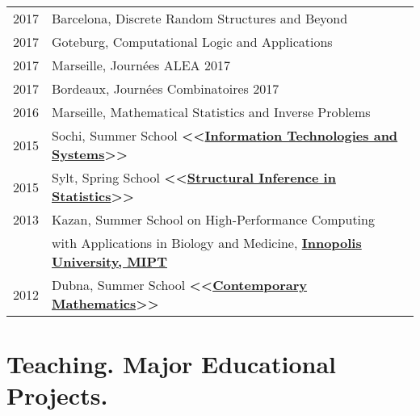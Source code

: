 \documentclass[a4paper,10pt]{article} %
\begin{document}
\begin{tabular}{rl}
2017 & Barcelona, Discrete Random Structures and Beyond\\
2017 & Goteburg, Computational Logic and Applications\\
2017 & Marseille, Journées ALEA 2017\\
2017 & Bordeaux, Journées Combinatoires 2017\\
2016 & Marseille, Mathematical Statistics and Inverse Problems\\
2015 & Sochi, Summer School \textbf{<<\href{http://itas2015.iitp.ru/en/}{Information Technologies and Systems}>>}\\
2015 & Sylt, Spring School \textbf{<<\href{https://www.mathematik.hu-berlin.de/de/for1735/prior-events/spring-school-2015}{Structural Inference in Statistics}>>} \\
2013 & Kazan, Summer School on High-Performance Computing\\& with Applications in Biology and Medicine, \textbf{\href{http://habrahabr.ru/company/innopolis_university/blog/192948/}{Innopolis University, MIPT}} \\
2012 & Dubna, Summer School \textbf{<<\href{http://www.mccme.ru/dubna/eng/}{Contemporary Mathematics}>>} \\
\end{tabular}



\vspace{1.2cm}

\section{Teaching. Major Educational Projects.}
\end{document}
